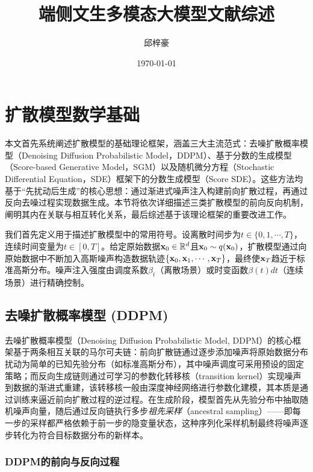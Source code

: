 \documentclass[11pt,a4paper,UTF8]{ctexart}
\title{端侧文生多模态大模型文献综述}
\author{邱梓豪}
\date{\today}
\begin{document}
\maketitle
\tableofcontents
\newpage

\section{扩散模型数学基础}

本文首先系统阐述扩散模型的基础理论框架，涵盖三大主流范式：去噪扩散概率模型（Denoising Diffusion Probabilistic Model，DDPM）\cite{sohldickstein2015diffusion,ho2020denoising}、基于分数的生成模型（Score-based Generative Model，SGM）\cite{song2019generative,song2020improved}以及随机微分方程（Stochastic Differential Equation，SDE）框架下的分数生成模型（Score SDE）\cite{song2020score,karras2022elucidating}。这些方法均基于“先扰动后生成”的核心思想：通过渐进式噪声注入构建前向扩散过程，再通过反向去噪过程实现数据生成。本节将依次详细描述三类扩散模型的前向反向机制，阐明其内在关联与相互转化关系，最后综述基于该理论框架的重要改进工作。

我们首先定义用于描述扩散模型中的常用符号。设离散时间步为$t\in\{0,1,\cdots,T\}$，连续时间变量为$t\in[0,T]$。给定原始数据$\mathbf{x}_0\in\mathbb{R}^d$且$\mathbf{x}_0\sim q(\mathbf{x}_0)$，扩散模型通过向原始数据中不断加入高斯噪声构造数据轨迹$\{\mathbf{x}_0,\mathbf{x}_1,\cdots,\mathbf{x}_T\}$，最终使$\mathbf{x}_T$趋近于标准高斯分布。噪声注入强度由调度系数$\beta_t$（离散场景）或时变函数$\beta(t)dt$（连续场景）进行精确控制。

\subsection{去噪扩散概率模型 (DDPM)}

去噪扩散概率模型（Denoising Diffusion Probabilistic Model, DDPM）的核心框架基于两条相互关联的马尔可夫链：前向扩散链通过逐步添加噪声将原始数据分布扰动为简单的已知先验分布（如标准高斯分布），其中噪声调度可采用预设的固定策略；而反向生成链则通过可学习的参数化转移核（transition kernel）实现噪声到数据的渐进式重建，该转移核一般由深度神经网络进行参数化建模，其本质是通过训练来逼近前向扩散过程的逆过程。在生成阶段，模型首先从先验分布中抽取随机噪声向量，随后通过反向链执行多步\emph{祖先采样}（ancestral sampling）\cite{koller2009probabilistic}——即每一步的采样都严格依赖于前一步的隐变量状态，这种序列化采样机制最终将噪声逐步转化为符合目标数据分布的新样本。

\subsubsection{DDPM的前向与反向过程}
\end{document}
